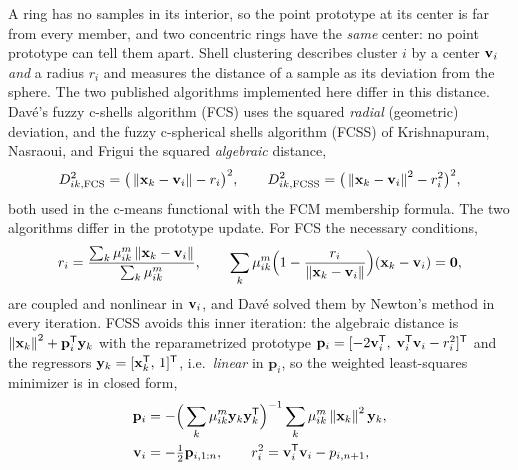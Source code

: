 A ring has no samples in its interior, so the point prototype at its center is far from every member, and two concentric rings have the \emph{same} center: no point prototype can tell them apart. Shell clustering describes cluster $i$ by a center $\mathbf{v}_i$ \emph{and} a radius $r_i$ and measures the distance of a sample as its deviation from the sphere. The two published algorithms implemented here differ in this distance. Davé's fuzzy c-shells algorithm (FCS) \cite{dave:1990:shells} uses the squared \emph{radial} (geometric) deviation, and the fuzzy c-spherical shells algorithm (FCSS) of Krishnapuram, Nasraoui, and Frigui \cite{krishnapuram:1992:fcss} the squared \emph{algebraic} distance,
\begin{equation}
  D^2_{ik,\mathrm{FCS}}=\big(\left\lVert \mathbf{x}_k-\mathbf{v}_i \right\rVert-r_i\big)^2,\qquad
  D^2_{ik,\mathrm{FCSS}}=\big(\left\lVert \mathbf{x}_k-\mathbf{v}_i \right\rVert^2-r_i^2\big)^2 ,
  \label{eq:robust:dshell}
\end{equation}
both used in the c-means functional with the FCM membership formula. The two algorithms differ in the prototype update. For FCS the necessary conditions,
\begin{equation}
  r_i=\frac{\sum_k\mu_{ik}^m\left\lVert \mathbf{x}_k-\mathbf{v}_i \right\rVert}{\sum_k\mu_{ik}^m},\qquad
  \sum_k\mu_{ik}^m\Big(1-\frac{r_i}{\left\lVert \mathbf{x}_k-\mathbf{v}_i \right\rVert}\Big)(\mathbf{x}_k-\mathbf{v}_i)=\mathbf{0},
  \label{eq:robust:fcs}
\end{equation}
are coupled and nonlinear in $\mathbf{v}_i$, and Davé solved them by Newton's method in every iteration. FCSS avoids this inner iteration: the algebraic distance is $\left\lVert \mathbf{x}_k \right\rVert^2+\mathbf{p}_i^{\mathsf{T}}\mathbf{y}_k$ with the reparametrized prototype $\mathbf{p}_i=[-2\mathbf{v}_i^{\mathsf{T}},\;\mathbf{v}_i^{\mathsf{T}}\mathbf{v}_i-r_i^2]^{\mathsf{T}}$ and the regressors $\mathbf{y}_k=[\mathbf{x}_k^{\mathsf{T}},\,1]^{\mathsf{T}}$, i.e.\ \emph{linear} in $\mathbf{p}_i$, so the weighted least-squares minimizer is in closed form,
\begin{equation}
  \begin{aligned}
  \mathbf{p}_i&=-\Big(\sum_k\mu_{ik}^m\mathbf{y}_k\mathbf{y}_k^{\mathsf{T}}\Big)^{-1}\sum_k\mu_{ik}^m\left\lVert \mathbf{x}_k \right\rVert^2\mathbf{y}_k ,\\
  \mathbf{v}_i&=-\tfrac12\mathbf{p}_{i,1:n},\qquad r_i^2=\mathbf{v}_i^{\mathsf{T}}\mathbf{v}_i-p_{i,n+1},
  \end{aligned}
  \label{eq:robust:fcss}
\end{equation}
